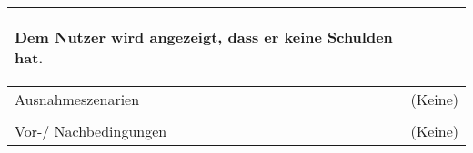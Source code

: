 \begin{table}[H]
\begin{tabularx}{0.95\textwidth}{ |l|X| }
\begin{enumerate}
				                                         \subitem[4b1.] Dem Nutzer wird angezeigt, dass er keine Schulden hat.
		                                         \end{enumerate} \\
		\hline
		Ausnahmeszenarien                      & (Keine)                                                                                                                                \\
		\hline
		\rowcolor{lightgray}                   &                                                                                                                                        \\
		\hline
		Vor-/ Nachbedingungen                  & (Keine)                                                                                                                                \\
		\hline
	\end{tabularx}
\end{table}



